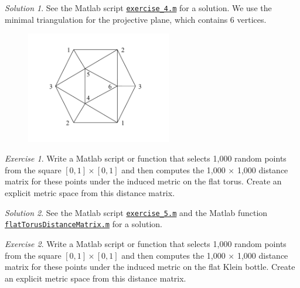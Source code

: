 \documentclass[amscd, amssymb, verbatim]{amsart}[12pt]
\theoremstyle{remark}
\theoremstyle{remark}
\newtheorem{exerciseSol}{Exercise}
\theoremstyle{remark}
\newtheorem*{solution}{Solution}
\begin{document}
\begin{solution}
See the Matlab script \href{https://github.com/appliedtopology/javaplex/tree/master/src/matlab/for_distribution/tutorial_solutions/exercise_4.m}{\texttt{exercise\_4.m}} for a solution. We use the minimal triangulation for the projective plane, which contains 6 vertices.
\end{solution}

\begin{figure}[htp]
  \begin{center}
    \includegraphics[width=2.5in]{projPlane}
   \end{center}
\end{figure}
\FloatBarrier

\begin{exerciseSol}
Write a Matlab script or function that selects 1,000 random points from the square $[0, 1] \times [0, 1]$ and then computes the 1,000 $\times$ 1,000 distance matrix for these points under the induced metric on the flat torus. Create an explicit metric space from this distance matrix.
\end{exerciseSol}

\begin{solution}
See the Matlab script \href{https://github.com/appliedtopology/javaplex/tree/master/src/matlab/for_distribution/tutorial_solutions/exercise_5.m}{\texttt{exercise\_5.m}} and the Matlab function \href{https://github.com/appliedtopology/javaplex/tree/master/src/matlab/for_distribution/tutorial_solutions/flatTorusDistanceMatrix.m}{\texttt{flatTorusDistanceMatrix.m}} for a solution.
\end{solution}

\begin{exerciseSol}
Write a Matlab script or function that selects 1,000 random points from the square $[0, 1] \times [0, 1]$ and then computes the 1,000 $\times$ 1,000 distance matrix for these points under the induced metric on the flat Klein bottle. Create an explicit metric space from this distance matrix.
\end{exerciseSol}
\end{document}
